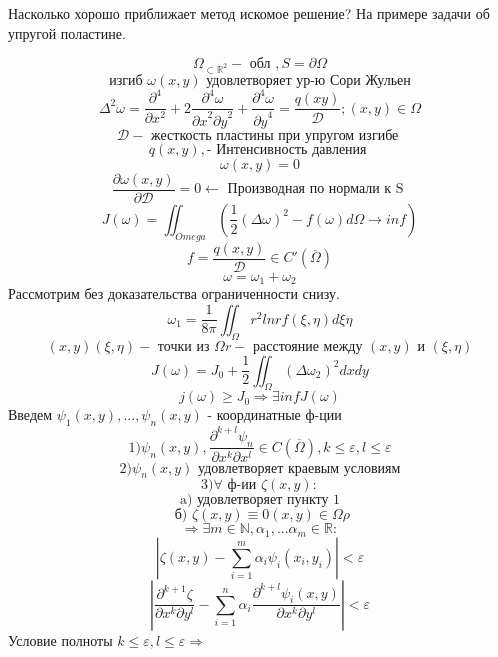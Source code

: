 \documentclass[12pt, a4paper]{article}
\begin{document}
Насколько хорошо приближает метод искомое решение?
На примере задачи об упругой поластине.

\[ \Omega_{\subset \mathbb{R}^2} - \textrm{ обл }, S = \partial \Omega \]
\[ \textrm{ изгиб } \omega(x,y) \textrm{ удовлетворяет ур-ю Сори Жульен }\]
\[ \Delta^2 \omega = \frac{\partial^4}{\partial x^2} + 2 \frac{\partial^4 \omega}{{\partial x}^2 {\partial y}^2} + \frac{\partial^4 \omega}{{\partial y}^4} = \frac{q(x y)}{\mathcal{D}}; (x,y) \in \Omega \]
\[ \mathcal{D} - \textrm{ жесткость пластины при упругом изгибе } \]
\[ q(x,y),\textrm{- Интенсивность давления } \]
\[ \omega (x,y) = 0 \]
\[ \frac{\partial \omega (x,y)}{\partial\mathcal{D} } = 0 \leftarrow \textrm{ Производная по нормали к S } \]
\[ J(\omega) = \iint_{Omega}( \frac{1}{2} (\Delta \omega)^2 - f(\omega) d \Omega \rightarrow inf) \]
\[ f = \frac{q(x,y)}{\mathcal{D}} \in C'(\overline{\Omega}) \]
\[ \omega = \omega_1 + \omega_2 \]
Рассмотрим без доказательства ограниченности снизу.
\[ \omega_1 = \frac{1}{8\pi} \iint_{\Omega} r^2 ln r f(\xi, \eta) d\xi \eta \]
\[ (x,y) (\xi, \eta) - \textrm{ точки из } \Omega r-\textrm{ расстояние между } (x,y)\textrm{ и } (\xi, \eta) \]
\[ J(\omega) = J_0 + \frac{1}{2} \iint_{\Omega} (\Delta \omega_2)^2 dx dy \]
\[ j(\omega) \geq J_0 \Rightarrow \exists inf J(\omega)\]
Введем $ \psi_1(x,y), ... , \psi_n(x,y) $ - координатные ф-ции
\[ 1) \psi_n(x,y), \frac{\partial^{k+l} \psi_n}{\partial x^k \partial x^l} \in C( \overline{ \Omega}), k \leq \varepsilon , l \leq \varepsilon \]
\[ 2) \psi_n(x,y) \textrm{ удовлетворяет краевым условиям} \]
\[ 3) \forall \textrm{ ф-ии } \zeta(x,y): \]
\[ \textrm{ a) удовлетворяет пункту 1 } \]
\[ \textrm{ б) } \zeta(x,y) \equiv 0 (x,y) \in \Omega \rho \]
\[ \Rightarrow \exists m \in \mathbb{N} , \alpha_1, ... \alpha_m \in \mathbb{R}: \]
\[ |\zeta(x,y) - \sum_{i=1}^{m} \alpha_i \psi_i (x_i, y_i)|< \varepsilon \]
\[ | \frac{\partial^{k+1}\zeta}{\partial x^k \partial y^l} - \sum_{i=1}^{n} \alpha_i \frac{\partial^{k+l} \psi_i (x,y)}{\partial x^k \partial y^l}| < \varepsilon \]
Условие полноты $ k \leq \varepsilon, l \leq \varepsilon \Rightarrow $
\end{document}

